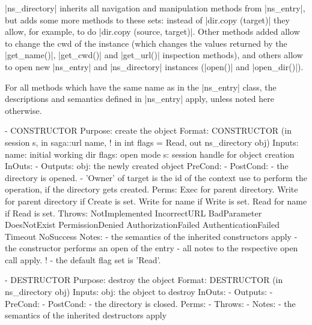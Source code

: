     |ns_directory| inherits all navigation and manipulation
    methods from |ns_entry|, but adds some more methods to these
    sets: instead of |dir.copy (target)| they allow, for
    example, to do |dir.copy (source, target)|.  Other methods
    added allow to change the cwd of the instance (which changes
    the values returned by the |get_name()|, |get_cwd()| and
    |get_url()| inspection methods), and others allow to open
    new |ns_entry| and |ns_directory| instances (|open()| and
    |open_dir()|).
 
    For all methods which have the same name as in the
    |ns_entry| class, the descriptions and semantics defined in
    |ns_entry| apply, unless noted here otherwise.
 
 
 \begin{myspec}
    - CONSTRUCTOR
      Purpose:  create the object
      Format:   CONSTRUCTOR          (in  session   s,
                                      in  saga::url name,
!                                     in  int       flags = Read,
                                      out ns_directory obj)
      Inputs:   name:                 initial working dir
                flags:                open mode
                s:                    session handle for
                                      object creation
      InOuts:   -
      Outputs:  obj:                  the newly created object
      PreCond:  -
      PostCond: - the directory is opened.
                - 'Owner' of target is the id of the context
                  use to perform the operation, if the
                  directory gets created.
      Perms:    Exec  for parent directory.
                Write for parent directory if Create is set.
                Write for name if Write is set.
                Read  for name if Read  is set.
      Throws:   NotImplemented
                IncorrectURL
                BadParameter
                DoesNotExist
                PermissionDenied
                AuthorizationFailed
                AuthenticationFailed
                Timeout
                NoSuccess
      Notes:    - the semantics of the inherited constructors
                  apply
                - the constructor performs an open of the 
                  entry - all notes to the respective open 
                  call apply.
!               - the default flag set is 'Read'.
 
 
    - DESTRUCTOR
      Purpose:  destroy the object
      Format:   DESTRUCTOR           (in  ns_directory obj)
      Inputs:   obj:                  the object to destroy
      InOuts:   -
      Outputs:  -
      PreCond:  -
      PostCond: - the directory is closed.
      Perms:    -
      Throws:   - 
      Notes:    - the semantics of the inherited destructors
                  apply
 

\end{myspec}
